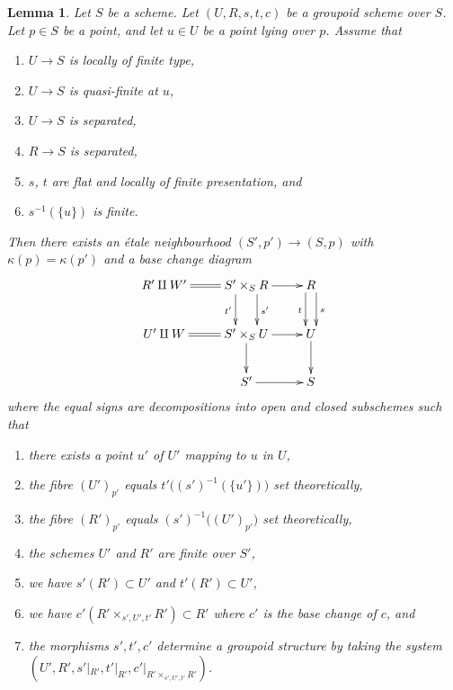 \documentclass{stacks-project}
\theoremstyle{plain}
\newtheorem{lemma}[subsection]{Lemma}
\theoremstyle{definition}
\theoremstyle{remark}
\numberwithin{equation}{subsection}
\begin{document}
\begin{lemma}
\label{lemma-quasi-finite-over-base}
Let $S$ be a scheme.
Let $(U, R, s, t, c)$ be a groupoid scheme over $S$.
Let $p \in S$ be a point, and let $u \in U$ be a point lying over $p$.
Assume that
\begin{enumerate}
\item $U \to S$ is locally of finite type,
\item $U \to S$ is quasi-finite at $u$,
\item $U \to S$ is separated,
\item $R \to S$ is separated,
\item $s$, $t$ are flat and locally of finite presentation, and
\item $s^{-1}(\{u\})$ is finite.
\end{enumerate}
Then there exists an \'etale neighbourhood $(S', p') \to (S, p)$ with
$\kappa(p) = \kappa(p')$ and a base change diagram
$$
\xymatrix{
R' \amalg W'
\ar@{=}[r] &
S' \times_S R
\ar[r] \ar@<2ex>[d]^{s'} \ar@<-2ex>[d]_{t'} &
R \ar@<1ex>[d]^s \ar@<-1ex>[d]_t \\
U' \amalg W
\ar@{=}[r] &
S' \times_S U
\ar[r] \ar[d] &
U \ar[d] \\
 &
S' \ar[r] &
S
}
$$
where the equal signs are decompositions into open and closed
subschemes such that
\begin{enumerate}
\item[(a)] there exists a point $u'$ of $U'$ mapping to $u$ in $U$,
\item[(b)] the fibre $(U')_{p'}$ equals $t'\big((s')^{-1}(\{u'\})\big)$
set theoretically,
\item[(c)] the fibre $(R')_{p'}$ equals $(s')^{-1}\big((U')_{p'}\big)$
set theoretically,
\item[(d)] the schemes $U'$ and $R'$ are finite over $S'$,
\item[(e)] we have $s'(R') \subset U'$ and $t'(R') \subset U'$,
\item[(f)] we have
$c'(R' \times_{s', U', t'} R') \subset R'$
where $c'$ is the base change of $c$, and
\item[(g)] the morphisms $s', t', c'$ determine a groupoid structure
by taking the system
$(U', R', s'|_{R'}, t'|_{R'}, c'|_{R' \times_{s', U', t'} R'})$.
\end{enumerate}
\end{lemma}
\end{document}
